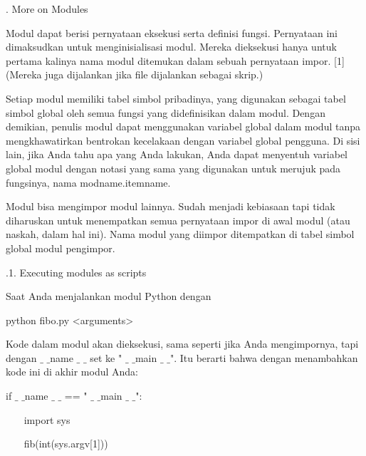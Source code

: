 \vspace{12pt}
. More on Modules \par
\noindent 
Modul dapat berisi pernyataan eksekusi serta definisi fungsi. Pernyataan ini dimaksudkan untuk menginisialisasi modul. Mereka dieksekusi hanya untuk pertama kalinya nama modul ditemukan dalam sebuah pernyataan impor. [1] (Mereka juga dijalankan jika file dijalankan sebagai skrip.) \par
\noindent 
Setiap modul memiliki tabel simbol pribadinya, yang digunakan sebagai tabel simbol global oleh semua fungsi yang didefinisikan dalam modul. Dengan demikian, penulis modul dapat menggunakan variabel global dalam modul tanpa mengkhawatirkan bentrokan kecelakaan dengan variabel global pengguna. Di sisi lain, jika Anda tahu apa yang Anda lakukan, Anda dapat menyentuh variabel global modul dengan notasi yang sama yang digunakan untuk merujuk pada fungsinya, nama modname.itemname. \par
\noindent 
Modul bisa mengimpor modul lainnya. Sudah menjadi kebiasaan tapi tidak diharuskan untuk menempatkan semua pernyataan impor di awal modul (atau naskah, dalam hal ini). Nama modul yang diimpor ditempatkan di tabel simbol global modul pengimpor. \par
\vspace{12pt}
\vspace{12pt}
\vspace{12pt}
\vspace{12pt}
\vspace{12pt}
\vspace{12pt}
.1. Executing modules as scripts \par
\noindent 
Saat Anda menjalankan modul Python dengan \par
\vspace{12pt}
\noindent 
python fibo.py <arguments> \par
\noindent 
Kode dalam modul akan dieksekusi, sama seperti jika Anda mengimpornya, tapi dengan  $  \_  $ $  \_  $name $  \_  $ $  \_  $ set ke " $  \_  $ $  \_  $main $  \_  $ $  \_  $". Itu berarti bahwa dengan menambahkan kode ini di akhir modul Anda: \par
\vspace{12pt}
\noindent 
if  $  \_  $ $  \_  $name $  \_  $ $  \_  $ == " $  \_  $ $  \_  $main $  \_  $ $  \_  $": \par
\noindent 
~~~ import sys \par
\noindent 
~~~ fib(int(sys.argv[1])) \par
